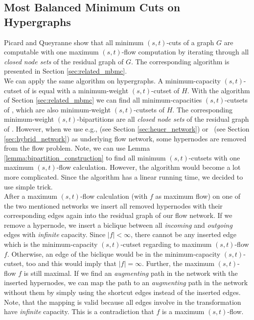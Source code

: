 \subsection{Most Balanced Minimum Cuts on Hypergraphs}
\label{sec:mbmc_hypergraphs}

Picard and Queyranne \cite{picard1980structure} show that all minimum $(s,t)$-cuts 
of a graph $G$ are computable with one maximum $(s,t)$-flow computation by 
iterating through all \emph{closed node sets} of the residual graph of $G$. 
The corresponding algorithm is presented in Section \ref{sec:related_mbmc}. \\
We can apply the same algorithm on hypergraphs. A minimum-capacity $(s,t)$-cutset of 
is equal with a minimum-weight $(s,t)$-cutset of $H$. With the algorithm
of Section \ref{sec:related_mbmc} we can find all minimum-capacities
$(s,t)$-cutsets of , which are also minimum-weight $(s,t)$-cutsets
of $H$. The corresponding minimum-weight $(s,t)$-bipartitions are all
\emph{closed node sets} of the residual graph of . 
However, when we use e.g.,  (see Section \ref{sec:heuer_network})
or \ShortHybrid~(see Section \ref{sec:hybrid_network}) as underlying flow network,
some hypernodes are removed from the flow problem. Note, we can use 
Lemma \ref{lemma:bipartition_construction} to find all minimum
$(s,t)$-cutsets with one maximum $(s,t)$-flow calculation. However, the algorithm would
become a lot more complicated. Since the algorithm has a linear running time, we decided
to use simple trick. \\
After a maximum $(s,t)$-flow calculation (with $f$ as maximum flow)
on one of the two mentioned networks we insert all removed hypernodes with
their corresponding edges again into the residual graph of our flow network.
If we remove a hypernode, we insert a biclique between all \emph{incoming}
and \emph{outgoing} edges with \emph{infinite} capacity. Since $|f| < \infty$,
there cannot be any inserted edge which is the minimum-capacity $(s,t)$-cutset
regarding to maximum $(s,t)$-flow $f$. Otherwise, an edge of the biclique
would be in the minimum-capacity $(s,t)$-cutset, too and this would imply that
$|f| = \infty$. Further, the maximum $(s,t)$-flow $f$ is still maximal. If we
find an \emph{augmenting} path in the network with the inserted hypernodes, we can
map the path to an \emph{augmenting} path in the network without them
by simply using the shortcut edges instead of the inserted edges. Note, that
the mapping is valid because all edges involve in the transformation have
\emph{infinite} capacity. This is a contradiction that $f$ is a maximum $(s,t)$-flow. 


